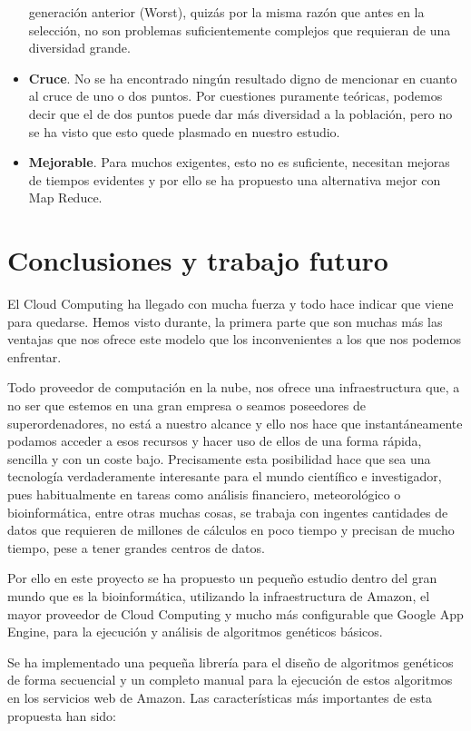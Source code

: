 \documentclass[runningheads]{llncs}
\begin{document}
\begin{itemize}
 generación anterior (Worst), quizás por la misma razón que antes en la selección, no son problemas suficientemente complejos 
 que requieran de una diversidad grande.
 \item \textbf{Cruce}. No se ha encontrado ningún resultado digno de mencionar en cuanto al cruce de uno o dos puntos. Por cuestiones 
 puramente teóricas, podemos decir que el de dos puntos puede dar más diversidad a la población, pero no se ha visto que esto 
 quede plasmado en nuestro estudio.
 \item \textbf{Mejorable}. Para muchos exigentes, esto no es suficiente, necesitan mejoras de tiempos evidentes y por ello se 
 ha propuesto una alternativa mejor con Map Reduce.
\end{itemize}

\section{Conclusiones y trabajo futuro}
\label{sec:conc}




El Cloud Computing ha llegado con mucha fuerza y todo hace indicar que viene para quedarse.  Hemos visto durante, 
la primera parte que son muchas más las ventajas que nos ofrece este modelo que los inconvenientes a los que nos podemos 
enfrentar.  

Todo proveedor de computación en la nube, nos ofrece una infraestructura que, a no ser que estemos en una gran empresa o 
seamos poseedores de superordenadores, no está a nuestro alcance y ello nos hace que instantáneamente podamos acceder 
a esos recursos y hacer uso de ellos de una forma rápida, sencilla y con un coste bajo.  Precisamente esta posibilidad hace que 
sea una tecnología verdaderamente interesante para el mundo científico e investigador, pues habitualmente en tareas como 
análisis financiero, meteorológico o bioinformática, entre otras muchas cosas, se trabaja con ingentes cantidades de datos 
que requieren de millones de cálculos en poco tiempo y precisan de mucho tiempo, pese a tener grandes centros de datos. 

Por ello en este proyecto se ha propuesto un pequeño estudio dentro del gran mundo que es la bioinformática, utilizando 
la infraestructura de Amazon, el mayor proveedor de Cloud Computing y mucho más configurable que Google App Engine,
para la ejecución y análisis de algoritmos genéticos básicos.  

Se ha implementado una pequeña librería para el diseño de algoritmos genéticos de forma secuencial y un completo manual para 
la ejecución de estos algoritmos en los servicios web de Amazon.  Las características más importantes de esta propuesta han sido:
\end{document}
